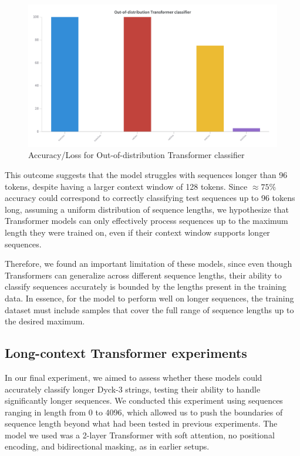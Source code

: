 \begin{figure}[ht]
    \centering
    \includegraphics[width=0.8\linewidth]{docs/figs/ood_results.png}
    \caption{Accuracy/Loss for Out-of-distribution Transformer classifier}
    \label{fig:ood_results}
\end{figure}

This outcome suggests that the model struggles with sequences longer than 96 tokens, despite having a larger context window of 128 tokens. Since $\approx 75\%$ accuracy could correspond to correctly classifying test sequences up to 96 tokens long, assuming a uniform distribution of sequence lengths, we hypothesize that Transformer models can only effectively process sequences up to the maximum length they were trained on, even if their context window supports longer sequences. 

Therefore, we found an important limitation of these models, since even though Transformers can generalize across different sequence lengths, their ability to classify sequences accurately is bounded by the lengths present in the training data. In essence, for the model to perform well on longer sequences, the training dataset must include samples that cover the full range of sequence lengths up to the desired maximum.

\subsection{Long-context Transformer experiments}

In our final experiment, we aimed to assess whether these models could accurately classify longer Dyck-3 strings, testing their ability to handle significantly longer sequences. We conducted this experiment using sequences ranging in length from 0 to 4096, which allowed us to push the boundaries of sequence length beyond what had been tested in previous experiments. The model we used was a 2-layer Transformer with soft attention, no positional encoding, and bidirectional masking, as in earlier setups.

